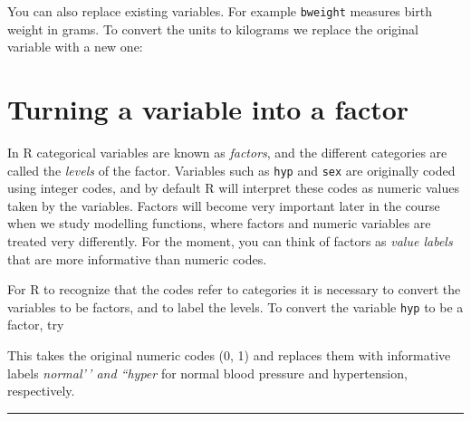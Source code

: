 \documentclass[
]{book}
\newenvironment{Shaded}{\begin{snugshade}}{\end{snugshade}}
\newcommand{\AttributeTok}[1]{\textcolor[rgb]{0.13,0.29,0.53}{#1}}
\newcommand{\DecValTok}[1]{\textcolor[rgb]{0.00,0.00,0.81}{#1}}
\newcommand{\FunctionTok}[1]{\textcolor[rgb]{0.13,0.29,0.53}{\textbf{#1}}}
\newcommand{\NormalTok}[1]{#1}
\newcommand{\OtherTok}[1]{\textcolor[rgb]{0.56,0.35,0.01}{#1}}
\newcommand{\SpecialCharTok}[1]{\textcolor[rgb]{0.81,0.36,0.00}{\textbf{#1}}}
\newcommand{\StringTok}[1]{\textcolor[rgb]{0.31,0.60,0.02}{#1}}
\begin{document}
You can also replace existing variables. For example \texttt{bweight} measures
birth weight in grams. To convert the units to kilograms we replace the
original variable with a new one:

\begin{Shaded}
\end{Shaded}

\section{Turning a variable into a factor}\label{turning-a-variable-into-a-factor}

In R categorical variables are known as \emph{factors}, and the
different categories are called the \emph{levels} of the factor.
Variables such as \texttt{hyp} and \texttt{sex} are originally coded using
integer codes, and by default R will interpret these codes as numeric
values taken by the variables. Factors will become very important
later in the course when we study modelling functions, where
factors and numeric variables are treated very differently. For the moment,
you can think of factors as \emph{value labels} that are more informative
than numeric codes.

For R to recognize that the codes refer to categories it is necessary
to convert the variables to be factors, and to label the levels. To
convert the variable \texttt{hyp} to be a factor, try

\begin{Shaded}
\end{Shaded}

This takes the original numeric codes (0, 1) and replaces them with
informative labels \emph{normal'\,' and ``hyper} for normal blood pressure
and hypertension, respectively.

\begin{center}\rule{0.5\linewidth}{0.5pt}\end{center}
\end{document}
